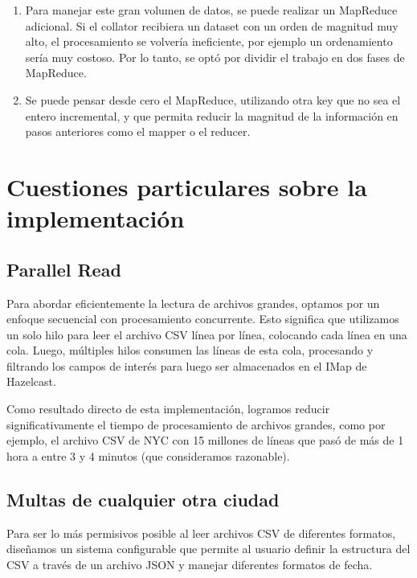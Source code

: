\documentclass[a4paper,12pt]{article}
\begin{document}
	\begin{enumerate}
		\item Para manejar este gran volumen de datos, se puede realizar un MapReduce adicional. Si el collator recibiera un dataset con un orden de magnitud muy alto, el procesamiento se volvería ineficiente, por ejemplo un ordenamiento sería muy costoso. Por lo tanto, se optó por dividir el trabajo en dos fases de MapReduce.
		\item Se puede pensar desde cero el MapReduce, utilizando otra key que no sea el entero incremental, y que permita reducir la magnitud de la información en pasos anteriores como el mapper o el reducer.
	\end{enumerate}
	
	\newpage
	
	\section{Cuestiones particulares sobre la implementación}
	
	\subsection{Parallel Read}
	
	Para abordar eficientemente la lectura de archivos grandes, optamos por un enfoque secuencial con procesamiento concurrente. Esto significa que utilizamos un solo hilo para leer el archivo CSV línea por línea, colocando cada línea en una cola. Luego, múltiples hilos consumen las líneas de esta cola, procesando y filtrando los campos de interés para luego ser almacenados en el IMap de Hazelcast.
	
	\bigskip
	
	Como resultado directo de esta implementación, logramos reducir significativamente el tiempo de procesamiento de archivos grandes, como por ejemplo, el archivo CSV de NYC con 15 millones de líneas que pasó de más de 1 hora a entre 3 y 4 minutos (que consideramos razonable).
	
	\subsection{Multas de cualquier otra ciudad}
	
	Para ser lo más permisivos posible al leer archivos CSV de diferentes formatos, diseñamos un sistema configurable que permite al usuario definir la estructura del CSV a través de un archivo JSON y manejar diferentes formatos de fecha.
	
\end{document}
